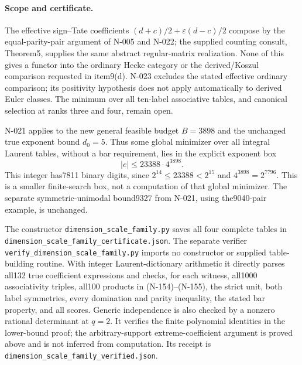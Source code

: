 \paragraph{Scope and certificate.}
The effective sign--Tate coefficients $(d+c)/2+\varepsilon(d-c)/2$
compose by the equal-parity-pair argument of N-005 and N-022;
the supplied counting consult, Theorem5, supplies the same abstract
regular-matrix realization.  None of this gives a functor into the
ordinary Hecke category or the derived/Koszul comparison requested
in item9(d).  N-023 excludes the stated effective ordinary comparison;
its positivity hypothesis does not apply automatically to derived
Euler classes.  The minimum over all ten-label associative tables,
and canonical selection at ranks three and four, remain open.

N-021 applies to the new general feasible budget $B=3898$ and the
unchanged true exponent bound $d_0=5$.  Thus some global minimizer
over all integral Laurent tables, without a bar requirement, lies
in the explicit exponent box
\[
              |e|\le23388\cdot4^{3898}.
\]
This integer has7811 binary digits, since
$2^{14}\le23388<2^{15}$ and $4^{3898}=2^{7796}$.
This is a smaller finite-search box, not a computation of that
global minimizer.  The separate symmetric-unimodal bound9327 from
N-021, using the9040-pair example, is unchanged.

The constructor \nolinkurl{dimension_scale_family.py} saves all four
complete tables in \nolinkurl{dimension_scale_family_certificate.json}.
The separate verifier \nolinkurl{verify_dimension_scale_family.py}
imports no constructor or supplied table-building routine.  With
integer Laurent-dictionary arithmetic it directly parses all132
true coefficient expressions and checks, for each witness, all1000
associativity triples, all100 products in (N-154)--(N-155), the strict
unit, both label symmetries, every domination and parity inequality,
the stated bar property, and all scores.  Generic independence is
also checked by a nonzero rational determinant at $q=2$.
It verifies the finite polynomial identities in the lower-bound
proof; the arbitrary-support extreme-coefficient argument is proved
above and is not inferred from computation.  Its receipt is
\nolinkurl{dimension_scale_family_verified.json}.

